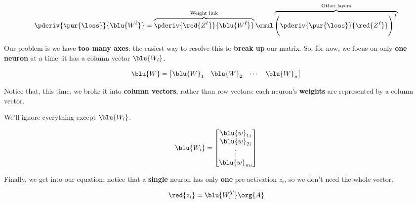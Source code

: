             \begin{equation}
                \pderiv {\pur{\loss}} {\blu{W^{\ell}}} 
                =
                \overbrace{
                    \pderiv {\red{Z^\ell}}   {\blu{W^{\ell}}}
                }^{\text{Weight link}} 
                    \cmul
                \overbrace{
                    \Bigg(
                        \pderiv {\pur{\loss}} {\red{Z^\ell}}
                    \Bigg)^T
                }^{\text{Other layers}}
            \end{equation}
            
        \subsecdiv
        
        Our problem is we have \textbf{too many axes}: the easiest way to resolve this to \textbf{break up} our matrix. So, for now, we focus on only \textbf{one neuron} at a time: it has a column vector $\blu{W_i}$.
        
        \begin{equation}
            \blu{W}
            =
            \begin{bmatrix}
                \blu{W}_1 & \blu{W}_2 & \cdots & \blu{W}_n
            \end{bmatrix}
        \end{equation}
        
        Notice that, this time, we broke it into \textbf{column vectors}, rather than row vectors: each neuron's \textbf{weights} are represented by a column vector.
        
        We'll ignore everything except $\blu{W_i}$.
        
        \begin{equation}
            \blu{W_i} = 
            \begin{bmatrix}
                \blu{w}_{1i} \\ \blu{w}_{2i} \\ \vdots \\ \blu{w}_{mi}
            \end{bmatrix}
        \end{equation}
        
        Finally, we get into our equation: notice that a \textbf{single} neuron has only \textbf{one} pre-activation $z_i$, so we don't need the whole vector.
        
        \begin{equation}
            \red{z_i} = \blu{W_i^T}\org{A}
        \end{equation}
        
